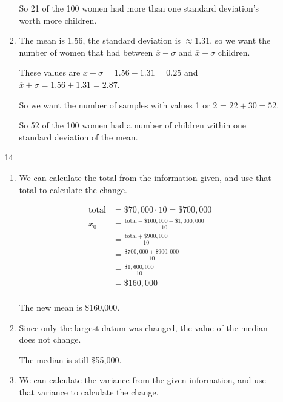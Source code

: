 \documentclass[12pt,letterpaper]{article}
\begin{document}
\begin{enumerate}
\begin{enumerate}
\begin{enumerate}[label=(\arabic*)]
              So 21 of the 100 women had more than one standard deviation's worth more children.

            \item
              The mean is $1.56$, the standard deviation is $\approx 1.31$,
              so we want the number of women that had between $\overline{x} - \sigma$ and $\overline{x} + \sigma$ children.

              These values are $\overline{x} - \sigma = 1.56 - 1.31 = 0.25$ and
              $\overline{x} + \sigma = 1.56 + 1.31 = 2.87$.

              So we want the number of samples with values 1 or 2 = $22 + 30 = 52$.

              So 52 of the 100 women had a number of children within one standard deviation of the mean.
          \end{enumerate}
        \item [14]
          \begin{enumerate}[label=(\arabic*)]
            \item
              We can calculate the total from the information given,
              and use that total to calculate the change.

              \begin{align*}
                \text{total} &= \$70,000 \cdot 10 = \$700,000 \\
                \overline{x_0} &= \frac{\text{total} - \$100,000 + \$1,000,000}{10} \\
                &= \frac{\text{total} + \$900,000}{10} \\
                &= \frac{\$700,000 + \$900,000}{10} \\
                &= \frac{\$1,600,000}{10} \\
                &= \$160,000 \\
              \end{align*}

              The new mean is \$160,000.

            \item
              Since only the largest datum was changed,
              the value of the median does not change.

              The median is still \$55,000.

            \item
              We can calculate the variance from the given information,
              and use that variance to calculate the change.


\end{enumerate}
\end{enumerate}
\end{enumerate}
\end{document}
